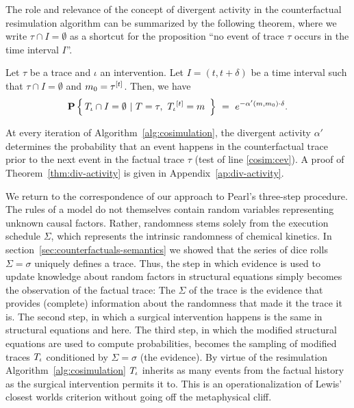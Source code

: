The role and relevance of the concept of divergent activity in the counterfactual resimulation algorithm can be summarized by the following theorem, where we write $\tau \cap I = \emptyset$ as a shortcut for the proposition ``no event of trace $\tau$ occurs in the time interval $I$''.
\begin{theorem}\label{thm:div-activity}
Let $\tau$ be a trace and $\iota$ an intervention. Let $I = (t, t+\delta)$ be    a time interval such that $\tau \cap I = \emptyset$ and $m_0 =\tau^{[t]}$. Then, we have
  \[\mathbf{P} \left\{\,  {T_\iota}{} \cap I = \emptyset  \ |\  T=\tau,\
      {T_\iota}{}^{[t]} = m\  \,\right\}
    \ =\ e^{-\alpha'(m, m_0) \cdot \delta}.
  \]
\end{theorem}
\noindent At every iteration of Algorithm~\ref{alg:cosimulation}, the divergent activity $\alpha'$ determines the probability that an event happens in the counterfactual trace prior to the next event in the factual trace $\tau$ (test of line \ref{cosim:cev}).  A proof of Theorem~\ref{thm:div-activity} is given in Appendix~\ref{ap:div-activity}.

We return to the correspondence of our approach to Pearl's three-step procedure. The rules of a model do not themselves contain random variables representing unknown causal factors. Rather, randomness stems solely from the execution schedule $\Sigma$, which represents the intrinsic randomness of chemical kinetics. In section~\ref{sec:counterfactuals-semantics} we showed that the series of dice rolls $\Sigma=\sigma$ uniquely defines a trace. Thus, the step in which evidence is used to update knowledge about random factors in structural equations simply becomes the observation of the factual trace: The $\Sigma$ of the trace is the evidence that provides (complete) information about the randomness that made it the trace it is. The second step, in which a surgical intervention happens is the same in structural equations and here. The third step, in which the modified structural equations are used to compute probabilities, becomes the sampling of modified traces ${T_\iota}{}$ conditioned by $\Sigma=\sigma$ (the evidence). By virtue of the resimulation Algorithm~\ref{alg:cosimulation} ${T_\iota}{}$ inherits as many events from the factual history as the surgical intervention permits it to. This is an operationalization of Lewis' closest worlds criterion without going off the metaphysical cliff.

%